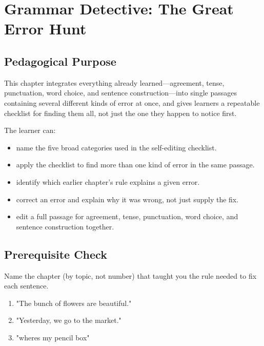 
\chapter{Grammar Detective: The Great Error Hunt}

\section{Pedagogical Purpose}
This chapter integrates everything already learned—agreement, tense, punctuation, word choice, and sentence construction—into single passages containing several different kinds of error at once, and gives learners a repeatable checklist for finding them all, not just the one they happen to notice first.

\begin{learningobjectives}
The learner can:
\begin{itemize}
    \item name the five broad categories used in the self-editing checklist.
    \item apply the checklist to find more than one kind of error in the same passage.
    \item identify which earlier chapter's rule explains a given error.
    \item correct an error and explain why it was wrong, not just supply the fix.
    \item edit a full passage for agreement, tense, punctuation, word choice, and sentence construction together.
\end{itemize}
\end{learningobjectives}

\section{Prerequisite Check}
\begin{quickcheck}
Name the chapter (by topic, not number) that taught you the rule needed to fix each sentence.
\begin{enumerate}
    \item "The bunch of flowers are beautiful."
    \item "Yesterday, we go to the market."
    \item "wheres my pencil box"
\end{enumerate}
\end{quickcheck}

